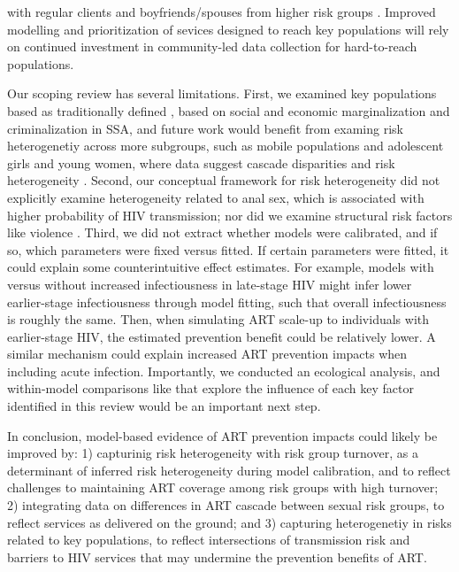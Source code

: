 with regular clients and boyfriends/spouses from higher risk groups \cite{Scorgie2012}.
Improved modelling and prioritization of sevices designed to reach key populations
will rely on continued investment in community-led data collection for hard-to-reach populations.
\par
Our scoping review has several limitations.
First, we examined key populations based as traditionally defined \cite{WHO2016KP},
based on social and economic marginalization and criminalization in SSA,
and future work would benefit from examing risk heterogenetiy across more subgroups,
such as mobile populations and adolescent girls and young women,
where data suggest cascade disparities and risk heterogeneity \cite{Tanser2015,Dellar2015}.
Second, our conceptual framework for risk heterogeneity did not explicitly examine
heterogeneity related to anal sex, which is associated with higher probability of HIV transmission;
nor did we examine structural risk factors like violence \cite{Silverman2011,Baggaley2013}.
Third, we did not extract whether models were calibrated,
and if so, which parameters were fixed versus fitted.
If certain parameters were fitted, it could explain some counterintuitive effect estimates.
For example, models with versus without increased infectiousness in late-stage HIV
might infer lower earlier-stage infectiousness through model fitting,
such that overall infectiousness is roughly the same.
Then, when simulating ART scale-up to individuals with earlier-stage HIV,
the estimated prevention benefit could be relatively lower.
A similar mechanism could explain increased ART prevention impacts when including acute infection.
Importantly, we conducted an ecological analysis,
and within-model comparisons like \cite{Dodd2010,Hontelez2013} that explore
the influence of each key factor identified in this review would be an important next step.
\par
In conclusion, model-based evidence of ART prevention impacts could likely be improved by:
1) capturinig risk heterogeneity with risk group turnover,
   as a determinant of inferred risk heterogeneity during model calibration, and
   to reflect challenges to maintaining ART coverage among risk groups with high turnover;
2) integrating data on differences in ART cascade between sexual risk groups,
   to reflect services as delivered on the ground; and
3) capturing heterogenetiy in risks related to key populations,
   to reflect intersections of transmission risk and barriers to HIV services
   that may undermine the prevention benefits of ART.
